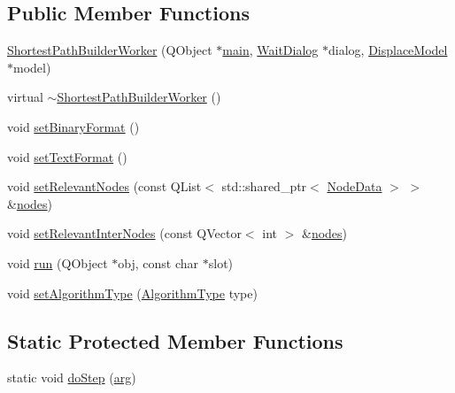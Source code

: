\subsection*{Public Member Functions}
\begin{DoxyCompactItemize}
\item 
\mbox{\hyperlink{classdisplace_1_1workers_1_1_shortest_path_builder_worker_abd397189adefcfa47c2be693784dba24}{Shortest\+Path\+Builder\+Worker}} (Q\+Object $\ast$\mbox{\hyperlink{tseditor_8cpp_a0ddf1224851353fc92bfbff6f499fa97}{main}}, \mbox{\hyperlink{class_wait_dialog}{Wait\+Dialog}} $\ast$dialog, \mbox{\hyperlink{class_displace_model}{Displace\+Model}} $\ast$model)
\item 
virtual \mbox{\hyperlink{classdisplace_1_1workers_1_1_shortest_path_builder_worker_a7cbeac860428efe2d3503c89f4e128e4}{$\sim$\+Shortest\+Path\+Builder\+Worker}} ()
\item 
void \mbox{\hyperlink{classdisplace_1_1workers_1_1_shortest_path_builder_worker_a7dd69bb81bb81f6cb06971d70e005ea9}{set\+Binary\+Format}} ()
\item 
void \mbox{\hyperlink{classdisplace_1_1workers_1_1_shortest_path_builder_worker_afb83ef2bda13ada9d6ee423dd8fa6b24}{set\+Text\+Format}} ()
\item 
void \mbox{\hyperlink{classdisplace_1_1workers_1_1_shortest_path_builder_worker_afa6baf7b0e01c8a72fec613f81edbb21}{set\+Relevant\+Nodes}} (const Q\+List$<$ std\+::shared\+\_\+ptr$<$ \mbox{\hyperlink{class_node_data}{Node\+Data}} $>$ $>$ \&\mbox{\hyperlink{thread__vessels_8cpp_ace5675146c8515428d094fd142d8a2d2}{nodes}})
\item 
void \mbox{\hyperlink{classdisplace_1_1workers_1_1_shortest_path_builder_worker_af4e8158046c6513c3f15844d5e03ed5e}{set\+Relevant\+Inter\+Nodes}} (const Q\+Vector$<$ int $>$ \&\mbox{\hyperlink{thread__vessels_8cpp_ace5675146c8515428d094fd142d8a2d2}{nodes}})
\item 
void \mbox{\hyperlink{classdisplace_1_1workers_1_1_shortest_path_builder_worker_abb3946e7f72ad93ea67d607d9f5639ec}{run}} (Q\+Object $\ast$obj, const char $\ast$slot)
\item 
void \mbox{\hyperlink{classdisplace_1_1workers_1_1_shortest_path_builder_worker_a263d95ef5f3b60f48ee942f255b0d176}{set\+Algorithm\+Type}} (\mbox{\hyperlink{classdisplace_1_1workers_1_1_shortest_path_builder_worker_a20590f897e75d7555cf40c2c65f8845a}{Algorithm\+Type}} type)
\end{DoxyCompactItemize}
\subsection*{Static Protected Member Functions}
\begin{DoxyCompactItemize}
\item 
static void \mbox{\hyperlink{classdisplace_1_1workers_1_1_shortest_path_builder_worker_a852e80ab48b47b0bb69272174e4f0850}{do\+Step}} (\mbox{\hyperlink{structdisplace_1_1workers_1_1_shortest_path_builder_worker_1_1arg}{arg}})
\end{DoxyCompactItemize}


